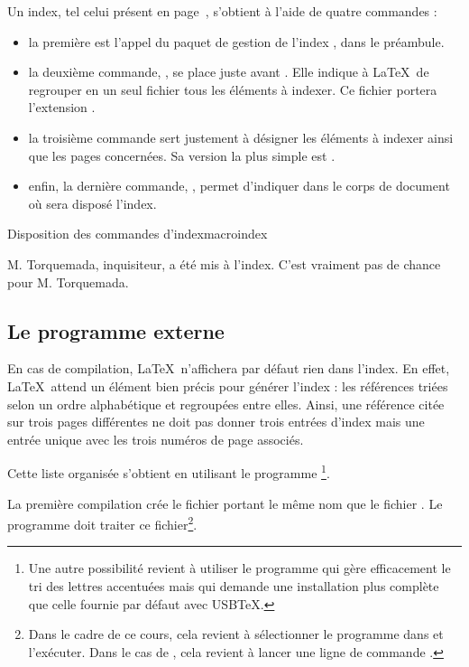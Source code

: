 Un index, tel celui présent en page~\pageref{index}, s'obtient à l'aide de quatre commandes :
\begin{itemize}
\item la première est l'appel du paquet de gestion de l'index , dans le préambule.
\item la deuxième commande, , se place juste avant . Elle indique à \LaTeX\ de regrouper en un seul fichier tous les éléments à indexer. Ce fichier portera l'extension .
\item la troisième commande sert justement à désigner les éléments à indexer ainsi que les pages concernées. Sa version la plus simple est .
\item enfin, la dernière commande, , permet d'indiquer dans le corps de document où sera disposé l'index.  
\end{itemize}

\begin{codesimple}{Disposition des commandes d'index}{macroindex}
\usepackage{makeidx}
\makeindex

M. Torquemada, inquisiteur, a été mis à l'index.
\printindex
C'est vraiment pas de chance pour M. Torquemada.

\end{codesimple}


\subsection{Le programme externe }

En cas de compilation, \LaTeX\ n'affichera par défaut rien dans l'index. En effet, \LaTeX\ attend un élément bien précis pour générer l'index : les références triées selon un ordre alphabétique et regroupées entre elles. Ainsi, une référence citée sur trois pages différentes ne doit pas donner trois entrées d'index mais une entrée unique avec les trois numéros de page associés. 

Cette liste organisée s'obtient en utilisant le programme \footnote{Une autre possibilité revient à utiliser le programme  qui gère efficacement le tri des lettres accentuées mais qui demande une installation plus complète que celle fournie par défaut avec USB\TeX.}.

La première compilation crée le fichier  portant le même nom que le fichier . Le programme  doit traiter ce fichier\footnote{Dans le cadre de ce cours, cela revient à sélectionner le programme  dans  et l'exécuter. Dans le cas de , cela revient à lancer une ligne de commande \og {} \fg.}.

